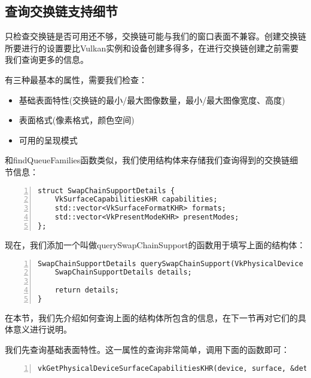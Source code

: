 \documentclass{ctexart}
\begin{document}
\subsection{查询交换链支持细节}

只检查交换链是否可用还不够，交换链可能与我们的窗口表面不兼容。创建交换链所要进行的设置要比Vulkan实例和设备创建多得多，在进行交换链创建之前需要我们查询更多的信息。

有三种最基本的属性，需要我们检查：

\begin{itemize}
	\item 基础表面特性(交换链的最小/最大图像数量，最小/最大图像宽度、高度)
	\item 表面格式(像素格式，颜色空间)
	\item 可用的呈现模式
\end{itemize}

和findQueueFamilies函数类似，我们使用结构体来存储我们查询得到的交换链细节信息：

\begin{lstlisting}[language={[ANSI]C},keywordstyle=\color{blue!70},commentstyle=\color{red!50!green!50!blue!50},frame=shadowbox, rulesepcolor=\color{red!20!green!20!blue!20},basicstyle=\small,numbers=left, numberstyle=\tiny,breaklines=true]
struct SwapChainSupportDetails {
	VkSurfaceCapabilitiesKHR capabilities;
	std::vector<VkSurfaceFormatKHR> formats;
	std::vector<VkPresentModeKHR> presentModes;
};
\end{lstlisting}

现在，我们添加一个叫做querySwapChainSupport的函数用于填写上面的结构体：

\begin{lstlisting}[language={[ANSI]C},keywordstyle=\color{blue!70},commentstyle=\color{red!50!green!50!blue!50},frame=shadowbox, rulesepcolor=\color{red!20!green!20!blue!20},basicstyle=\small,numbers=left, numberstyle=\tiny,breaklines=true]
SwapChainSupportDetails querySwapChainSupport(VkPhysicalDevice device) {
	SwapChainSupportDetails details;

	return details;
}
\end{lstlisting}

在本节，我们先介绍如何查询上面的结构体所包含的信息，在下一节再对它们的具体意义进行说明。

我们先查询基础表面特性。这一属性的查询非常简单，调用下面的函数即可：

\begin{lstlisting}[language={[ANSI]C},keywordstyle=\color{blue!70},commentstyle=\color{red!50!green!50!blue!50},frame=shadowbox, rulesepcolor=\color{red!20!green!20!blue!20},basicstyle=\small,numbers=left, numberstyle=\tiny,breaklines=true]
vkGetPhysicalDeviceSurfaceCapabilitiesKHR(device, surface, &details.capabilities);
\end{lstlisting}
\end{document}
